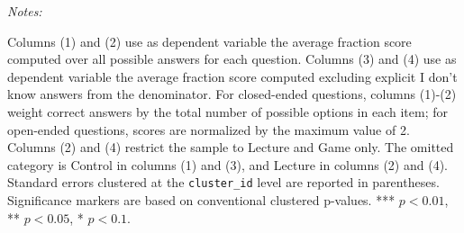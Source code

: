 \begin{table}[htbp]
\begin{tabular}{lcccc}
\\
\bottomrule
\hline
\hline
\end{tabular}
{\begin{flushleft}\parbox{\textwidth}{\tiny \hspace*{0.1cm}
\textit{Notes:}} Columns (1) and (2) use as dependent variable the average fraction score computed over all possible answers for each question. Columns (3) and (4) use as dependent variable the average fraction score computed excluding explicit I don't know answers from the denominator. For closed-ended questions, columns (1)-(2) weight correct answers by the total number of possible options in each item; for open-ended questions, scores are normalized by the maximum value of 2. Columns (2) and (4) restrict the sample to Lecture and Game only. The omitted category is Control in columns (1) and (3), and Lecture in columns (2) and (4). Standard errors clustered at the \texttt{cluster\_id} level are reported in parentheses. Significance markers are based on conventional clustered p-values. *** $p < 0.01$, ** $p < 0.05$, * $p < 0.1$.
\end{flushleft}}
\end{table}
